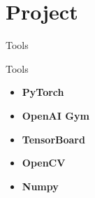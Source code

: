 \documentclass[presentation]{beamer}\mode<presentation>{\usetheme{AMSBolognaFC}}
\begin{document}
\section{Project}

\begin{frame}{Tools}
\begin{block}{Tools}
	\begin{itemize}
		\item \textbf{PyTorch}
		\item \textbf{OpenAI Gym}
		\item \textbf{TensorBoard}
		\item \textbf{OpenCV}
		\item \textbf{Numpy}
	\end{itemize}
\end{block}
\end{frame}
\end{document}
